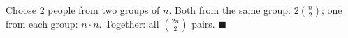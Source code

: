 Choose $2$ people from two groups of $n$. Both from the same group: $2\binom n2$; one from each group: $n\cdot n$. Together: all $\binom{2n}2$ pairs. $\blacksquare$
